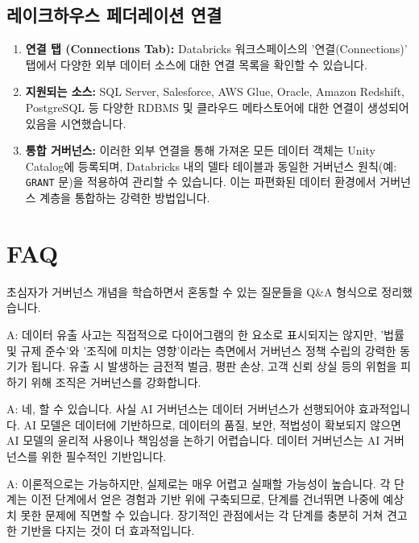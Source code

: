 \documentclass[11pt,a4paper]{article}
\begin{document}
\subsection*{레이크하우스 페더레이션 연결}

\begin{enumerate}
    \item \textbf{연결 탭 (Connections Tab):} Databricks 워크스페이스의 '연결(Connections)' 탭에서 다양한 외부 데이터 소스에 대한 연결 목록을 확인할 수 있습니다.
    \item \textbf{지원되는 소스:} SQL Server, Salesforce, AWS Glue, Oracle, Amazon Redshift, PostgreSQL 등 다양한 RDBMS 및 클라우드 메타스토어에 대한 연결이 생성되어 있음을 시연했습니다.
    \item \textbf{통합 거버넌스:} 이러한 외부 연결을 통해 가져온 모든 데이터 객체는 Unity Catalog에 등록되며, Databricks 내의 델타 테이블과 동일한 거버넌스 원칙(예: \texttt{GRANT} 문)을 적용하여 관리할 수 있습니다. 이는 파편화된 데이터 환경에서 거버넌스 계층을 통합하는 강력한 방법입니다.
\end{enumerate}

\newpage
\section*{FAQ}

초심자가 거버넌스 개념을 학습하면서 혼동할 수 있는 질문들을 Q\&A 형식으로 정리했습니다.

\begin{tcolorbox}[mybox, title={Q: 데이터 유출은 거버넌스 다이어그램에 어떻게 포함되나요?}]
A: 데이터 유출 사고는 직접적으로 다이어그램의 한 요소로 표시되지는 않지만, '법률 및 규제 준수'와 '조직에 미치는 영향'이라는 측면에서 거버넌스 정책 수립의 강력한 동기가 됩니다. 유출 시 발생하는 금전적 벌금, 평판 손상, 고객 신뢰 상실 등의 위험을 피하기 위해 조직은 거버넌스를 강화합니다.
\end{tcolorbox}

\begin{tcolorbox}[mybox, title={Q: AI 거버넌스 없이 데이터 거버넌스만 할 수 있나요?}]
A: 네, 할 수 있습니다. 사실 AI 거버넌스는 데이터 거버넌스가 선행되어야 효과적입니다. AI 모델은 데이터에 기반하므로, 데이터의 품질, 보안, 적법성이 확보되지 않으면 AI 모델의 윤리적 사용이나 책임성을 논하기 어렵습니다. 데이터 거버넌스는 AI 거버넌스를 위한 필수적인 기반입니다.
\end{tcolorbox}

\begin{tcolorbox}[mybox, title={Q: 거버넌스 성숙도 단계를 건너뛸 수 있나요?}]
A: 이론적으로는 가능하지만, 실제로는 매우 어렵고 실패할 가능성이 높습니다. 각 단계는 이전 단계에서 얻은 경험과 기반 위에 구축되므로, 단계를 건너뛰면 나중에 예상치 못한 문제에 직면할 수 있습니다. 장기적인 관점에서는 각 단계를 충분히 거쳐 견고한 기반을 다지는 것이 더 효과적입니다.
\end{tcolorbox}
\end{document}

